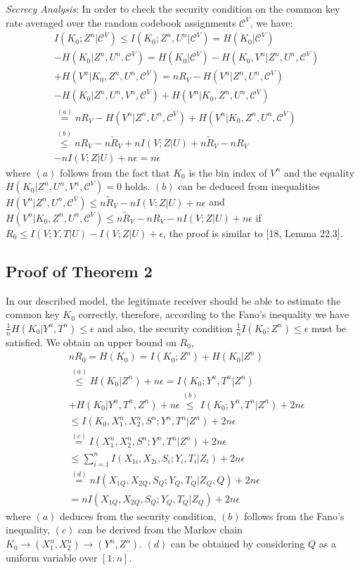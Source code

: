 \documentclass[conference,8pt]{IEEEtran}
\begin{document}
{{{{\emph{Secrecy Analysis}: In order to check the security condition on the common key rate averaged over the random codebook assignments $\mathcal{C}^V$, we have:
\begin{align}
&I(K_0;Z^n|\mathcal{C}^V) \leq I(K_0;Z^n,U^n|\mathcal{C}^V)=H(K_0|\mathcal{C}^V) \nonumber \\
&-H(K_0|Z^n,U^n,\mathcal{C}^V)= H(K_0|\mathcal{C}^V)-H(K_0,V^n|Z^n,U^n,\mathcal{C}^V) \nonumber \\
&+H(V^n|K_0,Z^n,U^n,\mathcal{C}^V)=nR_V-H(V^n|Z^n,U^n,\mathcal{C}^V)\nonumber \\
&-H(K_0|Z^n,U^n,V^n,\mathcal{C}^V)+H(V^n|K_0,Z^n,U^n,\mathcal{C}^V) \nonumber \\
&\stackrel{(a)}{=} nR_V-H(V^n|Z^n,U^n,\mathcal{C}^V)+H(V^n|K_0,Z^n,U^n,\mathcal{C}^V) \nonumber \\
&\stackrel{(b)}{\leq}  nR_V-n\tilde{R}_V+nI(V;Z|U)+n\tilde{R}_V-nR_V\nonumber \\
&-nI(V;Z|U)+n\epsilon= n\epsilon
\end{align}where $(a)$ follows from the fact that $K_0$ is the bin index of $V^n$ and the equality $H(K_0|Z^n,U^n,V^n,\mathcal{C}^V)=0$ holds. $(b)$ can be deduced from inequalities $H(V^n|Z^n,U^n,\mathcal{C}^V) \leq n\tilde{R}_V-nI(V;Z|U)+n\epsilon$ and $H(V^n|K_0,Z^n,U^n,\mathcal{C}^V) \leq n\tilde{R}_V-nR_V-nI(V;Z|U)+n\epsilon$ if $R_0 \leq I(V;Y,T|U)-I(V;Z|U)+\epsilon$, the proof is similar to [18, Lemma 22.3].

\subsection{Proof of Theorem 2}\label{sec:sec52}{
In our described model, the legitimate receiver should be able to estimate the common key $K_0$ correctly, therefore, according to the Fano's inequality we have $\frac{1}{n}H(K_0|Y^n,T^n) \leq \epsilon$ and also, the security condition $\frac{1}{n}I(K_0;Z^n) \leq \epsilon$ must be satisfied.
We obtain an upper bound on $R_0$,
\begin{align}
&nR_0=H(K_0)= I(K_0;Z^n)+H(K_0|Z^n) \nonumber \\ 
&\stackrel{(a)}{\leq} H(K_0|Z^n)+n\epsilon=I(K_0;Y^n,T^n|Z^n) \nonumber \\
&+H(K_0|Y^n,T^n,Z^n)+n\epsilon \stackrel{(b)}{\leq}  I(K_0;Y^n,T^n|Z^n)+2n\epsilon \nonumber \\
&\leq I(K_0,X^n_1,X^n_2,S^n;Y^n,T^n|Z^n)+2n\epsilon \nonumber \\
&\stackrel{(c)}{=} I(X^n_1,X^n_2,S^n;Y^n,T^n|Z^n)+2n\epsilon \nonumber \\ 
&\leq \sum_{i=1}^nI(X_{1i},X_{2i},S_i;Y_i,T_i|Z_i)+2n\epsilon \nonumber \\
&\stackrel{(d)}{=} nI(X_{1Q},X_{2Q},S_Q;Y_Q,T_Q|Z_Q,Q)+2n\epsilon \nonumber \\
&=nI(X_{1Q},X_{2Q},S_Q;Y_Q,T_Q|Z_Q)+2n\epsilon
\end{align}
where $(a)$ deduces from the security condition, $(b)$ follows from the Fano's inequality, $(c)$ can be derived from the Markov chain $K_0 \rightarrow (X_1^n,X_2^n) \rightarrow (Y^n,Z^n)$. $(d)$ can be obtained by considering $Q$ as a uniform variable over ${[1:n]}$.
}
}}}}
\end{document}
